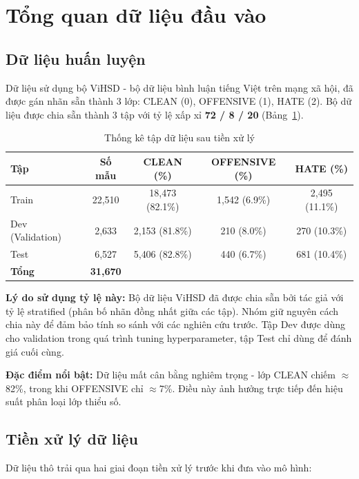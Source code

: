 \section{Tổng quan dữ liệu đầu vào}

\subsection{Dữ liệu huấn luyện}

Dữ liệu sử dụng bộ ViHSD \parencite{10.1007/978-3-030-79457-6_35} - bộ dữ liệu bình luận tiếng Việt trên mạng xã hội, đã được gán nhãn sẵn thành 3 lớp: CLEAN (0), OFFENSIVE (1), HATE (2). Bộ dữ liệu được chia sẵn thành 3 tập với tỷ lệ xấp xỉ \textbf{72 / 8 / 20} (Bảng~\ref{tab:data_split}).

\begin{table}[H]
\centering
\caption{Thống kê tập dữ liệu sau tiền xử lý}
\label{tab:data_split}
\begin{tabular}{|l|c|c|c|c|}
\hline
\textbf{Tập} & \textbf{Số mẫu} & \textbf{CLEAN (\%)} & \textbf{OFFENSIVE (\%)} & \textbf{HATE (\%)} \\
\hline
Train & 22{,}510 & 18{,}473 (82.1\%) & 1{,}542 (6.9\%) & 2{,}495 (11.1\%) \\
Dev (Validation) & 2{,}633 & 2{,}153 (81.8\%) & 210 (8.0\%) & 270 (10.3\%) \\
Test & 6{,}527 & 5{,}406 (82.8\%) & 440 (6.7\%) & 681 (10.4\%) \\
\hline
\textbf{Tổng} & \textbf{31{,}670} & & & \\
\hline
\end{tabular}
\end{table}

\textbf{Lý do sử dụng tỷ lệ này:} Bộ dữ liệu ViHSD đã được chia sẵn bởi tác giả với tỷ lệ stratified (phân bố nhãn đồng nhất giữa các tập). Nhóm giữ nguyên cách chia này để đảm bảo tính so sánh với các nghiên cứu trước. Tập Dev được dùng cho validation trong quá trình tuning hyperparameter, tập Test chỉ dùng để đánh giá cuối cùng.

\textbf{Đặc điểm nổi bật:} Dữ liệu mất cân bằng nghiêm trọng - lớp CLEAN chiếm $\approx$82\%, trong khi OFFENSIVE chỉ $\approx$7\%. Điều này ảnh hưởng trực tiếp đến hiệu suất phân loại lớp thiểu số.

\subsection{Tiền xử lý dữ liệu}

Dữ liệu thô trải qua hai giai đoạn tiền xử lý trước khi đưa vào mô hình:

